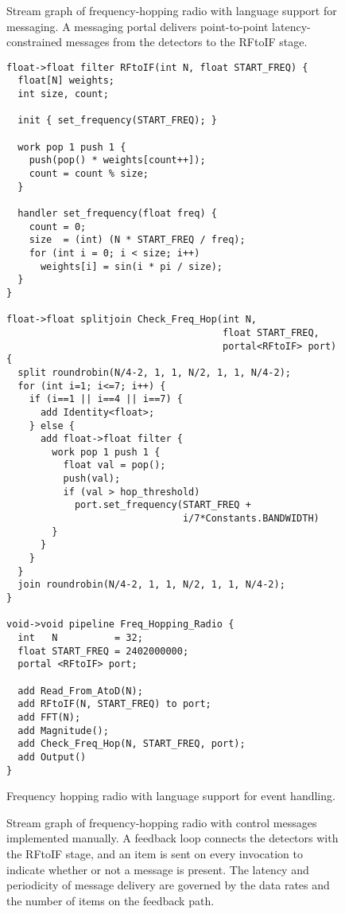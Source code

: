 \clearpage
\begin{figure}[t]
\caption{\small Stream graph of frequency-hopping radio with language
support for messaging.  A messaging portal delivers point-to-point
latency-constrained messages from the detectors to the RFtoIF stage.
\protect\label{fig:fhr-streamit}}
\end{figure}

\begin{figure}[t]
\scriptsize
\begin{verbatim}
float->float filter RFtoIF(int N, float START_FREQ) {
  float[N] weights;
  int size, count;
  
  init { set_frequency(START_FREQ); }
  
  work pop 1 push 1 {
    push(pop() * weights[count++]);
    count = count % size;
  }
  
  handler set_frequency(float freq) {
    count = 0;
    size  = (int) (N * START_FREQ / freq);
    for (int i = 0; i < size; i++)
      weights[i] = sin(i * pi / size);
  }
}

float->float splitjoin Check_Freq_Hop(int N, 
                                      float START_FREQ, 
                                      portal<RFtoIF> port) {
  split roundrobin(N/4-2, 1, 1, N/2, 1, 1, N/4-2);
  for (int i=1; i<=7; i++) {
    if (i==1 || i==4 || i==7) {
      add Identity<float>;
    } else {
      add float->float filter {
        work pop 1 push 1 {
          float val = pop();
          push(val);
          if (val > hop_threshold)
            port.set_frequency(START_FREQ + 
                               i/7*Constants.BANDWIDTH)
        }
      }
    }
  }
  join roundrobin(N/4-2, 1, 1, N/2, 1, 1, N/4-2);
}

void->void pipeline Freq_Hopping_Radio {
  int   N          = 32;
  float START_FREQ = 2402000000;
  portal <RFtoIF> port;

  add Read_From_AtoD(N);
  add RFtoIF(N, START_FREQ) to port;
  add FFT(N);
  add Magnitude();
  add Check_Freq_Hop(N, START_FREQ, port);
  add Output()
}
\end{verbatim}
\vspace{-12pt}
\caption{\small Frequency hopping radio with language support for event handling. \protect\label{fig:freq1}}
\end{figure}

\clearpage
\begin{figure}[t]
\caption{\small Stream graph of frequency-hopping radio with control
messages implemented manually.  A feedback loop connects the detectors
with the RFtoIF stage, and an item is sent on every invocation to
indicate whether or not a message is present.  The latency and
periodicity of message delivery are governed by the data rates and the
number of items on the feedback
path. \protect\label{fig:fhr-manual}}
\end{figure}


